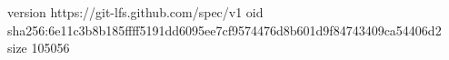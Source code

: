 version https://git-lfs.github.com/spec/v1
oid sha256:6e11c3b8b185ffff5191dd6095ee7cf9574476d8b601d9f84743409ca54406d2
size 105056
